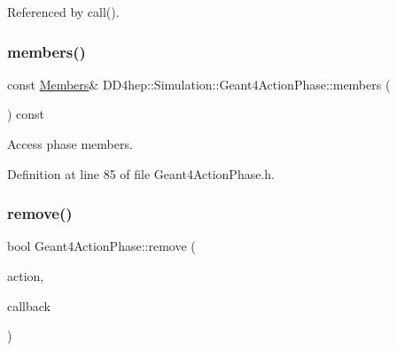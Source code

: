 Referenced by call().

\hypertarget{class_d_d4hep_1_1_simulation_1_1_geant4_action_phase_ada9ed3ec6ec673c9df6e41e116a7ddfa}{}\label{class_d_d4hep_1_1_simulation_1_1_geant4_action_phase_ada9ed3ec6ec673c9df6e41e116a7ddfa} 
\subsubsection{\texorpdfstring{members()}{members()}}
{\footnotesize\ttfamily const \hyperlink{class_d_d4hep_1_1_simulation_1_1_geant4_action_phase_a4df9a501a5c2d810603cd58f5ff5157d}{Members}\& D\+D4hep\+::\+Simulation\+::\+Geant4\+Action\+Phase\+::members (\begin{DoxyParamCaption}{ }\end{DoxyParamCaption}) const\hspace{0.3cm}{\ttfamily [inline]}}



Access phase members. 



Definition at line 85 of file Geant4\+Action\+Phase.\+h.

\hypertarget{class_d_d4hep_1_1_simulation_1_1_geant4_action_phase_aac2407103c62385824359ff8fa680f48}{}\label{class_d_d4hep_1_1_simulation_1_1_geant4_action_phase_aac2407103c62385824359ff8fa680f48} 
\subsubsection{\texorpdfstring{remove()}{remove()}\hspace{0.1cm}{\footnotesize\ttfamily [1/3]}}
{\footnotesize\ttfamily bool Geant4\+Action\+Phase\+::remove (\begin{DoxyParamCaption}\item[{\hyperlink{class_d_d4hep_1_1_simulation_1_1_geant4_action}{Geant4\+Action} $\ast$}]{action,  }\item[{\hyperlink{class_d_d4hep_1_1_callback}{Callback}}]{callback }\end{DoxyParamCaption})\hspace{0.3cm}{\ttfamily [virtual]}}



